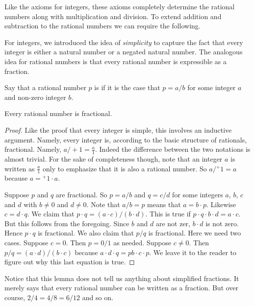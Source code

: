 Like the axioms for integers, these axioms completely determine the rational numbers along with multiplication and division. 
To extend addition and subtraction to the rational numbers we can require the following.

For integers, we introduced the idea of \emph{simplicity} to capture the fact that every integer is either a natural number or a negated natural number. The analogous idea for rational numbers is that every rational number is expressible as a fraction.

\begin{defn}
	Say that a rational number $p$ is  if it is the case that $p=a/b$ for some integer $a$ and non-zero integer $b$. 
\end{defn}

\begin{lem}
	Every rational number is fractional.
	
	\begin{proof}
		Like the proof that every integer is simple, this involves an inductive argument. Namely, every integer is, according to the basic structure of rationals, fractional. Namely, $a/{}+1 = \frac{a}1$. Indeed the difference between the two notations is almost trivial.
		For the sake of completeness though, note that an integer $a$ is written as $\frac{a}{1}$ only to emphasize that it is also a rational number. So $a/{}^+1 = a$ because $a = {}^+1\cdot a$.
		
		Suppose $p$ and $q$ are fractional. So $p=a/b$ and $q=c/d$ for some integers $a$, $b$, $c$ and $d$ with $b\neq 0$ and $d\neq 0$. Note that $a/b = p$ means that $a=b\cdot p$. Likewise $c=d\cdot q$. We claim that $p\cdot q = (a\cdot c)/(b\cdot d)$. This is true if
		$p\cdot q \cdot b\cdot d = a\cdot c$. But this follows from the foregoing. Since $b$ and $d$ are not zer, $b\cdot d$ is not zero. Hence $p\cdot q$ is fractional.
		We also claim that $p/q$ is fractional. Here we need two cases. Suppose $c=0$. Then $p=0/1$ as needed. Suppose $c\neq 0$. 
		Then $p/q = (a\cdot d)/(b\cdot c)$ because $a\cdot d \cdot q = p b\cdot c\cdot p$. We leave it to the reader to figure out why this last equation is true.
	\end{proof}
\end{lem}

Notice that this lemma does not tell us anything about simplified fractions. It merely says that every rational number can be written as a fraction. But over course, $2/4 = 4/8 = 6/12$ and so on.

